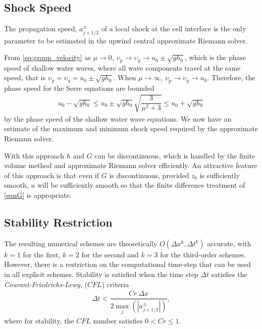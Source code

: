 \documentclass[preprint,sort&compress,1p]{article}
\begin{document}
\subsection{Shock Speed}

The propagation speed, $a^\pm_{j+1/2}$ of a local shock at the cell interface is the only parameter to be estimated in the upwind central approximate Riemann solver.

From \eqref{eq:group_velocity} as $\mu \rightarrow 0$, $\upsilon_p \rightarrow \upsilon_g \rightarrow u_0 \pm \sqrt{g h_0}$, which is the  phase speed of shallow water waves, where all wave components travel at the same speed, that is $\upsilon_p = \upsilon_g = u_0 \pm \sqrt{gh_0}$. When $\mu \rightarrow \infty$, $\upsilon_p \rightarrow \upsilon_g \rightarrow u_0$. Therefore, the phase speed for the Serre equations are bounded
\begin{gather}
u_0 - \sqrt{g h_0} \le u_0 \pm \sqrt{gh_0}\sqrt{\dfrac{3}{\mu^2 + 3}} \le u_0 + \sqrt{g h_0}
\end{gather}
by the phase speed of the shallow water wave equations. We now have an estimate of the maximum and minimum shock speed required by the approximate Riemann solver.

With this approach $h$ and $G$ can be discontinuous, which is handled by the finite volume method and approximate Riemann solver efficiently. An attractive feature of this approach is that even if $G$ is discontinuous, provided $z_b$ is sufficiently smooth, $u$ will be sufficiently smooth so that the finite difference treatment of \eqref{eqnG} is appropriate.

\subsection{Stability Restriction}

The resulting numerical schemes are theoretically $O(\Delta x^k, \Delta t^k)$ accurate, with $k = 1$ for the first, $k = 2$ for the second and $k = 3$ for the third-order schemes. However, there is a restriction on the computational time-step that can be used in all explicit schemes. Stability is satisfied when the time step $\Delta t$ satisfies the \emph{Courant-Friedrichs-Lewy}, ($CFL$) criteria~\cite{Harten-etal-1983-357}
\begin{gather} %
\Delta t < \dfrac{ \textit{Cr} \ \Delta x}{2 \max_{j} (|a^\pm_{j+1/2}|)} ,
\end{gather}
where for stability, the $CFL$ number satisfies  $0< \textit{Cr} \leq1$.
\end{document}
